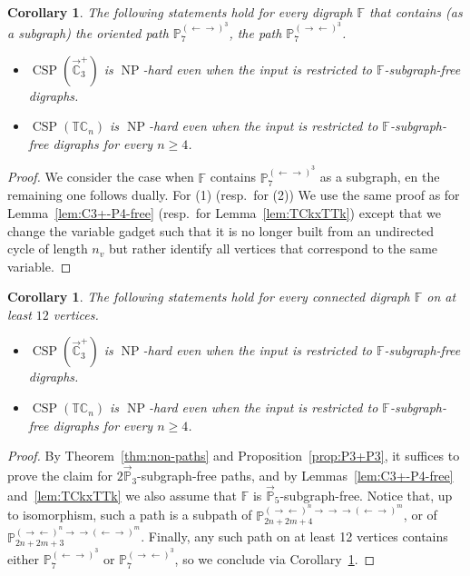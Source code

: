 \documentclass{article}
\newtheorem{corollary}[theorem]{Corollary}
\theoremstyle{definition}
\theoremstyle{remark}
\DeclareMathOperator{\NP}{NP}
\DeclareMathOperator{\CSP}{CSP}
\newcommand{\bC}{{\mathbb C}}
\newcommand{\bF}{{\mathbb F}}
\newcommand{\bP}{{\mathbb P}}
\newcommand{\bT}{{\mathbb T}}
\begin{document}
\begin{corollary}\label{cor:P8-alternation}
    The following statements hold for every digraph $\bF$ that contains (as a subgraph)
    the oriented path $\bP_7^{(\leftarrow\rightarrow)^3}$, the path
    $\bP_7^{(\rightarrow\leftarrow)^3}$.
    \begin{itemize}
        \item $\CSP(\vec{\bC}_3^+)$ is $\NP$-hard even when the input is restricted to $\bF$-subgraph-free digraphs.
        \item $\CSP(\bT\bC_n)$ is $\NP$-hard even when the input is restricted to $\bF$-subgraph-free digraphs
        for every $n\ge 4$.
    \end{itemize}
\end{corollary}
\begin{proof}
    We consider the case when $\bF$ contains $\bP_7^{(\leftarrow\rightarrow)^3}$ as a subgraph, 
    en the remaining one follows dually. For (1) (resp.\ for (2)) We use the same proof
    as for Lemma~\ref{lem:C3+-P4-free} (resp.\ for Lemma~\ref{lem:TCkxTTk}) except that we
    change the variable gadget such that it is no longer built from an undirected cycle of
    length $n_v$ but rather identify all vertices that correspond to the same variable. 
\end{proof}

\begin{corollary}\label{cor:bounded-size}
    The following statements hold for every connected digraph $\bF$ on at least $12$ vertices.
    \begin{itemize}
        \item $\CSP(\vec{\bC}_3^+)$ is $\NP$-hard even when the input is restricted to $\bF$-subgraph-free digraphs.
        \item $\CSP(\bT\bC_n)$ is $\NP$-hard even when the input is restricted to $\bF$-subgraph-free digraphs for every $n\ge 4$.
    \end{itemize}
\end{corollary}
\begin{proof}
    By Theorem~\ref{thm:non-paths} and Proposition~\ref{prop:P3+P3}, it suffices to prove the
    claim for  $2\vec{\bP}_3$-subgraph-free paths, and by Lemmas~\ref{lem:C3+-P4-free} 
    and~\ref{lem:TCkxTTk} we also assume that $\bF$ is $\vec{\bP}_5$-subgraph-free. Notice that,
    up to isomorphism, such a path is a subpath of $\bP_{2n+2m+4}^{(\rightarrow\leftarrow)^n\rightarrow\rightarrow\rightarrow(\leftarrow\rightarrow)^m}$, or of
    $\bP_{2n+2m+3}^{(\rightarrow\leftarrow)^n\rightarrow\rightarrow(\leftarrow\rightarrow)^m}$. Finally, 
    any such path on at least 12 vertices contains either $\bP_7^{(\leftarrow\rightarrow)^3}$
    or $\bP_7^{(\rightarrow\leftarrow)^3}$, so we conclude via
    Corollary~\ref{cor:P8-alternation}.
\end{proof}
\end{document}

